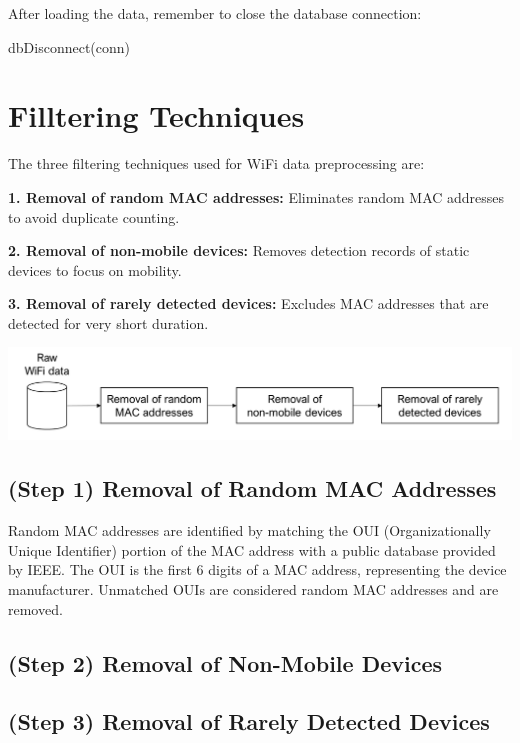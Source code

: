 \documentclass[
  letterpaper,
]{scrbook}
\newenvironment{Shaded}{\begin{snugshade}}{\end{snugshade}}
\newcommand{\FunctionTok}[1]{\textcolor[rgb]{0.28,0.35,0.67}{#1}}
\newcommand{\NormalTok}[1]{\textcolor[rgb]{0.00,0.23,0.31}{#1}}
\begin{document}
After loading the data, remember to close the database connection:

\begin{Shaded}
\begin{Highlighting}[]
\FunctionTok{dbDisconnect}\NormalTok{(conn)}
\end{Highlighting}
\end{Shaded}

\section{Filltering Techniques}\label{filltering-techniques}

The three filtering techniques used for WiFi data preprocessing are:

\textbf{1. Removal of random MAC addresses:} Eliminates random MAC
addresses to avoid duplicate counting.

\textbf{2. Removal of non-mobile devices:} Removes detection records of
static devices to focus on mobility.

\textbf{3. Removal of rarely detected devices:} Excludes MAC addresses
that are detected for very short duration.

\includegraphics{content/material/ch3/preprocessing.png}

\subsection{(Step 1) Removal of Random MAC
Addresses}\label{step-1-removal-of-random-mac-addresses}

Random MAC addresses are identified by matching the OUI
(Organizationally Unique Identifier) portion of the MAC address with a
public database provided by IEEE. The OUI is the first 6 digits of a MAC
address, representing the device manufacturer. Unmatched OUIs are
considered random MAC addresses and are removed.

\subsection{(Step 2) Removal of Non-Mobile
Devices}\label{step-2-removal-of-non-mobile-devices}

\subsection{(Step 3) Removal of Rarely Detected
Devices}\label{step-3-removal-of-rarely-detected-devices}
\end{document}

